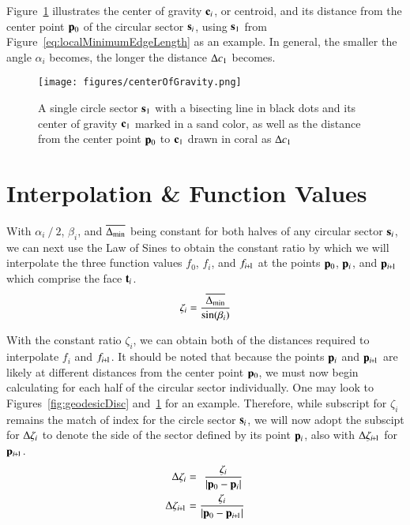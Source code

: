 Figure~\ref{fig:centerOfGravity} illustrates the center of gravity $\mathbf{c}_i$, or centroid,  and its distance from the center point $\mathbf{p}_0$ of the circular sector $\mathbf{s}_i$, using $\mathbf{s}_1$ from Figure~\ref{eq:localMinimumEdgeLength} as an example. In general, the smaller the angle $\alpha_i$ becomes, the longer the distance $\Delta c_1$ becomes.
\begin{figure}[ht]
\ffigbox
	{\texttt{[image: figures/centerOfGravity.png]}}
	{\caption[Distance to the Center of Gravity]{A single circle sector $\mathbf{s}_1$ with a bisecting line in black dots and its center of gravity $\mathbf{c}_1$ marked in a sand color, as well as the distance from the center point $\mathbf{p}_0$ to $\mathbf{c}_1$ drawn in coral as $\Delta c_1$}\label{fig:centerOfGravity}}
\end{figure}%
%
%
\section{Interpolation \& Function Values}
\label{cFONSsIFV}
With $\alpha_i\mathbin{/}2$, $\beta_i$, and $\overline{\Delta_\text{min}}$ being constant for both halves of any circular sector $\mathbf{s}_i$, we can next use the Law of Sines to obtain the constant ratio by which we will interpolate the three function values $f_0$, $f_i$, and $f_{\sipo}$ at the points $\mathbf{p}_0$, $\mathbf{p}_i$, and $\bp_{\sipo}$ which comprise the face $\mathbf{t}_i$.
\begin{equation}
	\zeta_i = \frac{\overline{\Delta_\text{min}}}{\sin(\beta_i)}
	\label{eq:zeta}
\end{equation}%
%
%

With the constant ratio $\zeta_i$, we can obtain both of the distances required to interpolate $f_i$ and $f_{\sipo}$. It should be noted that because the points $\mathbf{p}_i$ and $\bp_{\sipo}$ are likely at different distances from the center point $\mathbf{p}_0$, we must now begin calculating for each half of the circular sector individually. One may look to Figures~\ref{fig:geodesicDisc} and~\ref{fig:centerOfGravity} for an example. Therefore, while subscript for $\zeta_i$ remains the match of index for the circle sector $\mathbf{s}_i$, we will now adopt the subscipt for $\Delta\zeta_i$ to denote the side of the sector defined by its point $\mathbf{p}_i$, also with $\Dz_{\sipo}$ for $\bp_{\sipo}$.
\begin{align}
	\Dz_i & = \kern4pt\frac{\zeta_i}{|\bp_0 - \bp_i|}
	\label{eq:distanceIForInterpolation}\\
	\Dz_{\sipo} & = \frac{\zeta_i}{|\bp_0 - \bp_{\sipo}|}
	\label{eq:distanceIp1ForInterpolation}
\end{align}%
%

